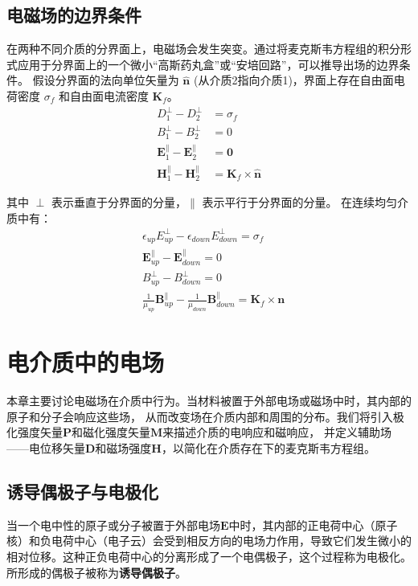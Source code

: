 \documentclass[fontset=none]{ctexart}
\begin{document}
\subsection{电磁场的边界条件}
在两种不同介质的分界面上，电磁场会发生突变。通过将麦克斯韦方程组的积分形式应用于分界面上的一个微小“高斯药丸盒”或“安培回路”，可以推导出场的边界条件。
假设分界面的法向单位矢量为 $\hat{\bm{n}}$ (从介质2指向介质1)，界面上存在自由面电荷密度 $\sigma_f$ 和自由面电流密度 $\bm{K}_f$。
\begin{equation}    
\begin{aligned}
    D_1^{\perp} - D_2^{\perp} &= \sigma_f \\
    B_1^{\perp} - B_2^{\perp} &= 0 \\
    \bm{E}_1^{\parallel} - \bm{E}_2^{\parallel} &= \bm{0} \\
    \bm{H}_1^{\parallel} - \bm{H}_2^{\parallel} &= \bm{K}_f \times \hat{\bm{n}}
\end{aligned}
\end{equation}

其中 $\perp$ 表示垂直于分界面的分量，$\parallel$ 表示平行于分界面的分量。
在连续均匀介质中有：
\begin{equation}
    \begin{aligned}
    &\epsilon_{up}E^{\perp}_{up} - \epsilon_{down}E^{\perp}_{down} = \sigma_f \\
    &\bm{E}^{\parallel}_{up} - \bm{E}^{\parallel}_{down} = 0 \\
    &B^{\perp}_{up} - B^{\perp}_{down} = 0 \\
    &\frac{1}{\mu_{up}}\bm{B}^{\parallel}_{up} - \frac{1}{\mu_{down}}\bm{B}^{\parallel}_{down} = \bm{K}_f \times \bm{n}
\end{aligned}
\end{equation}

\section{电介质中的电场}
本章主要讨论电磁场在介质中行为。当材料被置于外部电场或磁场中时，其内部的原子和分子会响应这些场，
从而改变场在介质内部和周围的分布。我们将引入极化强度矢量$\bm{P}$和磁化强度矢量$\bm{M}$来描述介质的电响应和磁响应，
并定义辅助场——电位移矢量$\bm{D}$和磁场强度$\bm{H}$，以简化在介质存在下的麦克斯韦方程组。

\subsection{诱导偶极子与电极化}
当一个电中性的原子或分子被置于外部电场$\bm{E}$中时，其内部的正电荷中心（原子核）和负电荷中心（电子云）会受到相反方向的电场力作用，导致它们发生微小的相对位移。这种正负电荷中心的分离形成了一个电偶极子，这个过程称为电极化。所形成的偶极子被称为\textbf{诱导偶极子}。
\end{document}
